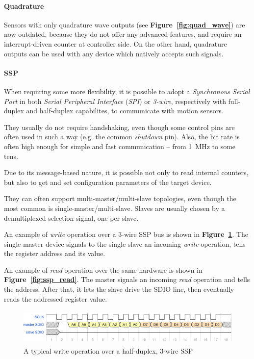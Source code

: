 \documentclass[a4paper,10pt]{article}
\newcommand{\citef}[1]{\textbf{Figure~\ref{#1}}}
\begin{document}
\begin{multicols}{2}
\paragraph{Quadrature}
Sensors with only quadrature wave outputs (see \citef{fig:quad_wave}) are now
outdated, because they do not offer any advanced features, and require an
interrupt-driven counter at controller side. On the other hand, quadrature
outputs can be used with any device which natively accepts such signals.


\paragraph{SSP}
When requiring some more flexibility, it is possible to adopt a
\emph{Synchronous Serial Port} in both \emph{Serial Peripheral Interface}
(\emph{SPI}) or \emph{3-wire}, respectively with full-duplex and half-duplex
capabilites, to communicate with motion sensors.

They usually do not require handshaking, even though some control pins are
often used in such a way (e.g. the common \emph{shutdown} pin). Also, the
bit rate is often high enough for simple and fast communication -- from
1~MHz to some tens.

Due to its message-based nature, it is possible not only to read internal
counters, but also to get and set configuration parameters of the target
device.

They can often support multi-master/multi-slave topologies, even though the
most common is single-master/multi-slave. Slaves are usually chosen by a
demultiplexed selection signal, one per slave.

An example of \emph{write} operation over a 3-wire SSP bus is shown in
\citef{fig:ssp_write}. The single master device signals to the single slave
an incoming \emph{write} operation, tells the register address and its value.

An example of \emph{read} operation over the same hardware is shown in
\citef{fig:ssp_read}. The master signals an incoming \emph{read} operation
and tells the address. After that, it lets the slave drive the SDIO line,
then eventually reads the addressed register value.

\begin{figure}[t]
	\centering
	\includegraphics[keepaspectratio=true,height=1.8cm]{images/ssp_write.pdf}
	\caption{A typical write operation over a half-duplex, 3-wire SSP}
	\label{fig:ssp_write}
\end{figure}


\end{multicols}
\end{document}
